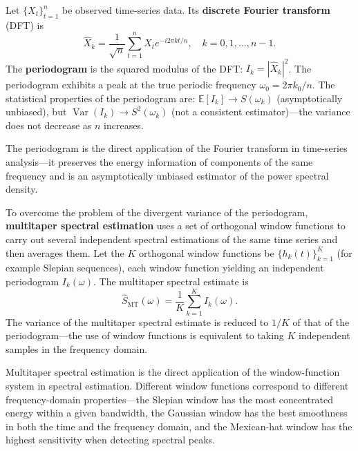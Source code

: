 \begin{definition}\label{def:spectral_analysis}
Let $\{X_t\}_{t=1}^{n}$ be observed time-series data. Its \textbf{discrete Fourier transform} (DFT) is
\[
\hat{X}_k = \frac{1}{\sqrt{n}} \sum_{t=1}^{n} X_t e^{-i 2\pi k t / n}, \quad k = 0, 1, \dots, n-1.
\]
The \textbf{periodogram} is the squared modulus of the DFT: $I_k = |\hat{X}_k|^2$. The periodogram exhibits a peak at the true periodic frequency $\omega_0 = 2\pi k_0/n$. The statistical properties of the periodogram are: $\mathbb{E}[I_k] \to S(\omega_k)$ (asymptotically unbiased), but $\operatorname{Var}(I_k) \to S^2(\omega_k)$ (not a consistent estimator)---the variance does not decrease as $n$ increases.

The periodogram is the direct application of the Fourier transform in time-series analysis---it preserves the energy information of components of the same frequency and is an asymptotically unbiased estimator of the power spectral density.
\end{definition}

\begin{proposition}\label{prop:multitaper}
To overcome the problem of the divergent variance of the periodogram, \textbf{multitaper spectral estimation} uses a set of orthogonal window functions to carry out several independent spectral estimations of the same time series and then averages them. Let the $K$ orthogonal window functions be $\{h_k(t)\}_{k=1}^{K}$ (for example Slepian sequences), each window function yielding an independent periodogram $I_k(\omega)$. The multitaper spectral estimate is
\[
\hat{S}_{\text{MT}}(\omega) = \frac{1}{K} \sum_{k=1}^{K} I_k(\omega).
\]
The variance of the multitaper spectral estimate is reduced to $1/K$ of that of the periodogram---the use of window functions is equivalent to taking $K$ independent samples in the frequency domain.

Multitaper spectral estimation is the direct application of the window-function system in spectral estimation. Different window functions correspond to different frequency-domain properties---the Slepian window has the most concentrated energy within a given bandwidth, the Gaussian window has the best smoothness in both the time and the frequency domain, and the Mexican-hat window has the highest sensitivity when detecting spectral peaks.
\end{proposition}

